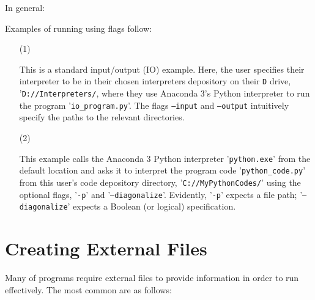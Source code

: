 In general:


Examples of running using flags follow:

\begin{itemize}
\item[(1)]	%
\item[] This is a standard input/output (IO) example. Here, the user specifies their interpreter to be in their chosen interpreters depository on their \texttt{D} drive, '\texttt{D://Interpreters/}, where they use Anaconda 3's Python interpreter to run the program '\texttt{io\_program.py}'. The flags \texttt{--input} and \texttt{--output} intuitively specify the paths to the relevant directories.
%
\item[(2)]	%
\item[]	This example calls the Anaconda 3 Python interpreter '\texttt{python.exe}' from the default location and asks it to interpret the program code '\texttt{python\_code.py}' from this user's code depository directory, '\texttt{C://MyPythonCodes/}' using the optional flags, '\texttt{-p}' and '\texttt{--diagonalize}'. Evidently, '\texttt{-p}' expects a file path; '\texttt{--diagonalize}' expects a Boolean (or logical) specification.
\end{itemize}


\pagebreak
\section{Creating External Files}
Many of programs require external files to provide information in order to run effectively. The most common are as follows:

